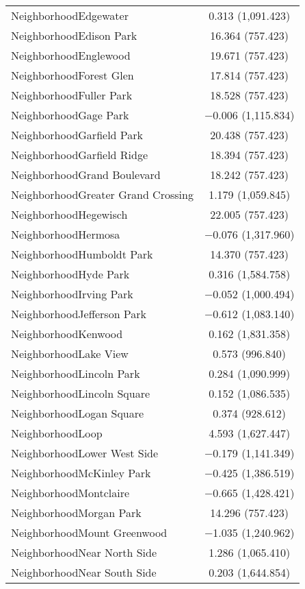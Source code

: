 \documentclass{report}
\begin{document}
\begin{table}[!htbp]
\begin{tabular}{@{\extracolsep{5pt}}lc}
 NeighborhoodEdgewater & 0.313 (1,091.423) \\ 
 NeighborhoodEdison Park & 16.364 (757.423) \\ 
 NeighborhoodEnglewood & 19.671 (757.423) \\ 
 NeighborhoodForest Glen & 17.814 (757.423) \\ 
 NeighborhoodFuller Park & 18.528 (757.423) \\ 
 NeighborhoodGage Park & $-$0.006 (1,115.834) \\ 
 NeighborhoodGarfield Park & 20.438 (757.423) \\ 
 NeighborhoodGarfield Ridge & 18.394 (757.423) \\ 
 NeighborhoodGrand Boulevard & 18.242 (757.423) \\ 
 NeighborhoodGreater Grand Crossing & 1.179 (1,059.845) \\ 
 NeighborhoodHegewisch & 22.005 (757.423) \\ 
 NeighborhoodHermosa & $-$0.076 (1,317.960) \\ 
 NeighborhoodHumboldt Park & 14.370 (757.423) \\ 
 NeighborhoodHyde Park & 0.316 (1,584.758) \\ 
 NeighborhoodIrving Park & $-$0.052 (1,000.494) \\ 
 NeighborhoodJefferson Park & $-$0.612 (1,083.140) \\ 
 NeighborhoodKenwood & 0.162 (1,831.358) \\ 
 NeighborhoodLake View & 0.573 (996.840) \\ 
 NeighborhoodLincoln Park & 0.284 (1,090.999) \\ 
 NeighborhoodLincoln Square & 0.152 (1,086.535) \\ 
 NeighborhoodLogan Square & 0.374 (928.612) \\ 
 NeighborhoodLoop & 4.593 (1,627.447) \\ 
 NeighborhoodLower West Side & $-$0.179 (1,141.349) \\ 
 NeighborhoodMcKinley Park & $-$0.425 (1,386.519) \\ 
 NeighborhoodMontclaire & $-$0.665 (1,428.421) \\ 
 NeighborhoodMorgan Park & 14.296 (757.423) \\ 
 NeighborhoodMount Greenwood & $-$1.035 (1,240.962) \\ 
 NeighborhoodNear North Side & 1.286 (1,065.410) \\ 
 NeighborhoodNear South Side & 0.203 (1,644.854) \\ 

\end{tabular}
\end{table}
\end{document}
